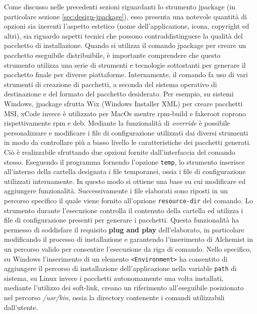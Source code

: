 Come discusso nelle precedenti sezioni riguardanti lo strumento jpackage (in particolare sezione \ref{sec:design-jpackage}), esso presenta una notevole quantità di opzioni sia inerenti l'aspetto estetico (nome dell'applicazione, icona, copyright ed altri), sia riguardo aspetti tecnici che possono contraddistinguere la qualità del pacchetto di installazione. Quando si utilizza il comando jpackage per creare un pacchetto eseguibile distribuibile, è importante comprendere che questo strumento utilizza una serie di strumenti e tecnologie sottostanti per generare il pacchetto finale per diverse piattaforme. Internamente, il comando fa uso di vari strumenti di creazione di pacchetti, a seconda del sistema operativo di destinazione e del formato del pacchetto desiderato. Per esempio, su sistemi Windows, jpackage sfrutta Wix (Windows Installer XML) per creare pacchetti MSI, xCode invece è utilizzato per MacOs mentre rpm-build e fakeroot coprono rispettivamente rpm e deb. Mediante la funzionalità di \textit{override} è possibile personalizzare e modificare i file di configurazione utilizzati dai diversi strumenti in modo da controllare più a basso livello le caratteristiche dei pacchetti generati. Ciò è realizzabile sfruttando due opzioni fornite dall'interfaccia del comando stesso. Eseguendo il programma fornendo l'opzione \texttt{temp}, lo strumento inserisce all'interno della cartella designata i file temporanei, ossia i file di configurazione utilizzati internamente. In questo modo si ottiene una base su cui modificare ed aggiungere funzionalità. Successivamente i file elaborati sono riposti in un percorso specifico il quale viene fornito all'opzione \texttt{resource-dir} del comando. Lo strumento durante l'esecuzione controlla il contenuto della cartella ed utilizza i file di configurazione presenti per generare i pacchetti. Questa funzionalità ha permesso di soddisfare il requisito \textbf{plug and play} dell'elaborato, in particolare modificando il processo di installazione e garantendo l'inserimento di Alchemist in un percorso valido per consentire l'esecuzione da riga di comando. Nello specifico, su Windows l'inserimento di un elemento \texttt{<Environment>} ha consentito di aggiungere il percorso di installazione dell'applicazione nella variable \texttt{path} di sistema, su Linux invece i pacchetti autonomamente una volta installati, mediante l'utilizzo dei soft-link, creano un riferimento all'eseguibile posizionato nel percorso \textit{/usr/bin}, ossia la directory contenente i comandi utilizzabili dall'utente.

